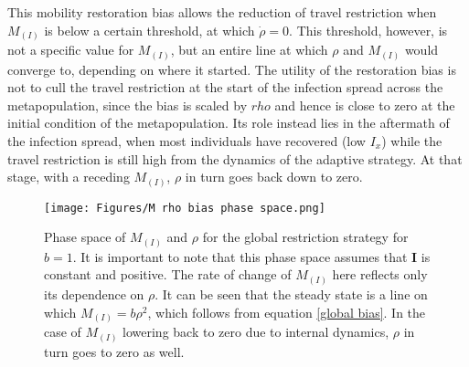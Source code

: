 This mobility restoration bias allows the reduction of travel restriction when $M_{(I)}$ is below a certain threshold, at which $\dot \rho=0$. This threshold, however, is not a specific value for $M_{(I)}$, but an entire line at which $\rho$ and $M_{(I)}$ would converge to, depending on where it started. The utility of the restoration bias is not to cull the travel restriction at the start of the infection spread across the metapopulation, since the bias is scaled by $rho$ and hence is close to zero at the initial condition of the metapopulation. Its role instead lies in the aftermath of the infection spread, when most individuals have recovered (low $I_x$) while the travel restriction is still high from the dynamics of the adaptive strategy. At that stage, with a receding $M_{(I)}$, $\rho$ in turn goes back down to zero.


\begin{figure}
    \centering
    \texttt{[image: Figures/M rho bias phase space.png]}
    \caption{\small Phase space of $M_{(I)}$ and $\rho$ for the global restriction strategy for $b=1$. It is important to note that this phase space assumes that $\mathbf{I}$ is constant and positive. The rate of change of $M_{(I)}$ here reflects only its dependence on $\rho$. It can be seen that the steady state is a line on which $M_{(I)}=b \rho^2$, which follows from equation \eqref{global bias}. In the case of $M_{(I)}$ lowering back to zero due to internal dynamics, $\rho$ in turn goes to zero as well.}
\end{figure}




% 